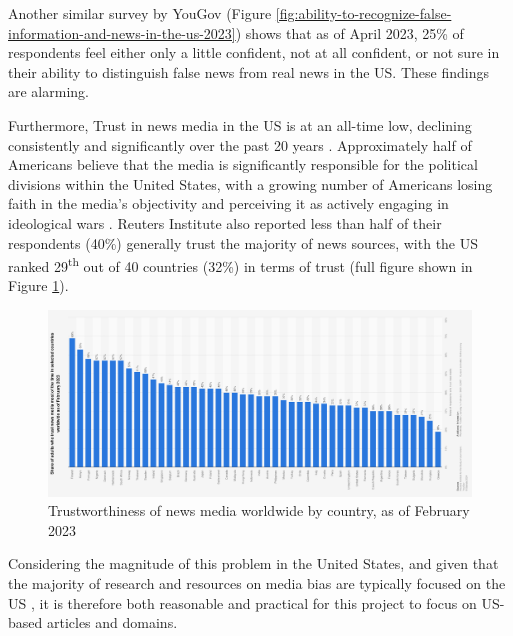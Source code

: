 Another similar survey by YouGov \cite{yougov-2023-confidence} (Figure \ref{fig:ability-to-recognize-false-information-and-news-in-the-us-2023}) shows that as of April 2023, 25\% of respondents feel either only a little confident, not at all confident, or not sure in their ability to distinguish false news from real news in the US. These findings are alarming.

Furthermore, Trust in news media in the US is at an all-time low, declining consistently and significantly over the past 20 years \cite{pew-2021-partisan-divides, gallup-knight-2020-american-views, reuters-2023-digital-news-report}. Approximately half of Americans believe that the media is significantly responsible for the political divisions within the United States, with a growing number of Americans losing faith in the media's objectivity and perceiving it as actively engaging in ideological wars \cite{gallup-knight-2020-american-views}. Reuters Institute also reported less than half of their respondents (40\%) generally trust the majority of news sources, with the US ranked 29\textsuperscript{th} out of 40 countries (32\%) in terms of trust \cite{reuters-2023-digital-news-report,reuters-2023-trust} (full figure shown in Figure \ref{fig:trustworthiness-of-news-media-worldwide-2023}).

\begin{figure}[htbp]
    \centering
    \includegraphics[width=1\linewidth]{images/statistic_id308468_trustworthiness-of-news-media-worldwide-2023.png}
    \caption{Trustworthiness of news media worldwide by country, as of February 2023 \cite{reuters-2023-trust}}
    \label{fig:trustworthiness-of-news-media-worldwide-2023}
\end{figure}

Considering the magnitude of this problem in the United States, and given that the majority of research and resources on media bias are typically focused on the US \cite{allsides, adfontes,rodrigo-2024-systematic-review-media-bias}, it is therefore both reasonable and practical for this project to focus on US-based articles and domains.


